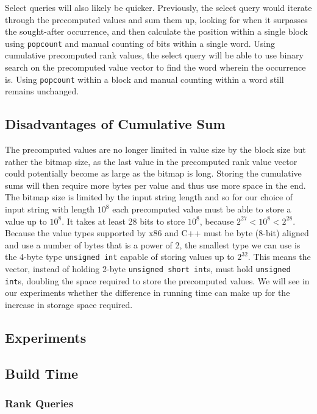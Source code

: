 Select queries will also likely be quicker.
Previously, the select query would iterate through the precomputed values and sum them up, looking for when it surpasses the sought-after occurrence, and then calculate the position within a single block using \texttt{popcount} and manual counting of bits within a single word.
Using cumulative precomputed rank values, the select query will be able to use binary search on the precomputed value vector to find the word wherein the occurrence is.
Using \texttt{popcount} within a block and manual counting within a word still remains unchanged.

\subsection{Disadvantages of Cumulative Sum}
The precomputed values are no longer limited in value size by the block size but rather the bitmap size, as the last value in the precomputed rank value vector could potentially become as large as the bitmap is long.
Storing the cumulative sums will then require more bytes per value and thus use more space in the end.
The bitmap size is limited by the input string length and so for our choice of input string with length $10^8$ each precomputed value must be able to store a value up to $10^8$.
It takes at least 28 bits to store $10^8$, because $2^{27} < 10^8 < 2^{28}$.
Because the value types supported by x86 and C++ must be byte (8-bit) aligned and use a number of bytes that is a power of 2, the smallest type we can use is the 4-byte type \texttt{unsigned int} capable of storing values up to $2^{32}$.
This means the vector, instead of holding 2-byte \texttt{unsigned short int}s, must hold \texttt{unsigned int}s, doubling the space required to store the precomputed values.
We will see in our experiments whether the difference in running time can make up for the increase in storage space required.


\subsection{Experiments}

\subsection{Build Time}

\subsubsection{Rank Queries}

